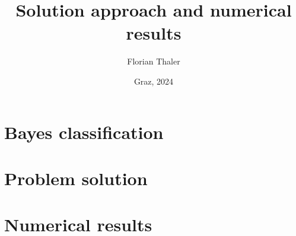 \documentclass{article}
\title{Solution approach and numerical results}
\author{Florian Thaler}
\date{Graz, 2024}
\begin{document}
    \maketitle

    \tableofcontents
    \newpage
    \section{Bayes classification}\label{sctn:bayes_classification}
        
        \newpage

		\section{Problem solution}
			
			\newpage

    \section{Numerical results}
        
        \newpage

    
    
\end{document}
